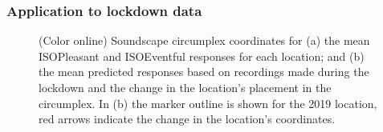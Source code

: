 \documentclass[
  authoryear,
  preprint,
  3p,
  onecolumn]{elsarticle}
\begin{document}
\subsubsection{Application to lockdown data}\label{sec-application}

\begin{figure}


\caption{\label{fig-locations}(Color online) Soundscape circumplex
coordinates for (a) the mean ISOPleasant and ISOEventful responses for
each location; and (b) the mean predicted responses based on recordings
made during the lockdown and the change in the location's placement in
the circumplex. In (b) the marker outline is shown for the 2019
location, red arrows indicate the change in the location's coordinates.}

\end{figure}%
\end{document}
